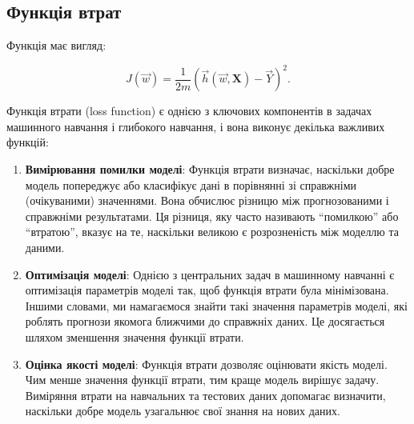\documentclass[]{article}
\begin{document}
\subsection{Функція
	втрат}\label{ux444ux443ux43dux43aux446ux456ux44f-ux432ux442ux440ux430ux442}

Функція має вигляд:

\[ J(\vec{w}) = \frac1{2m} \left( \vec{h}(\vec{w}, \mathbf{X}) - \vec{Y} \right)^2. \]

Функція втрати (loss function) є однією з ключових компонентів в задачах
машинного навчання і глибокого навчання, і вона виконує декілька
важливих функцій:

\begin{enumerate}
	\def\labelenumi{\arabic{enumi}.}
	\item
	      \textbf{Вимірювання помилки моделі}: Функція втрати визначає,
	      наскільки добре модель попереджує або класифікує дані в порівнянні зі
	      справжніми (очікуваними) значеннями. Вона обчислює різницю між
	      прогнозованими і справжніми результатами. Ця різниця, яку часто
	      називають ``помилкою'' або ``втратою'', вказує на те, наскільки
	      великою є розрозненість між моделлю та даними.
	\item
	      \textbf{Оптимізація моделі}: Однією з центральних задач в машинному
	      навчанні є оптимізація параметрів моделі так, щоб функція втрати була
	      мінімізована. Іншими словами, ми намагаємося знайти такі значення
	      параметрів моделі, які роблять прогнози якомога ближчими до справжніх
	      даних. Це досягається шляхом зменшення значення функції втрати.
	\item
	      \textbf{Оцінка якості моделі}: Функція втрати дозволяє оцінювати
	      якість моделі. Чим менше значення функції втрати, тим краще модель
	      вирішує задачу. Виміряння втрати на навчальних та тестових даних
	      допомагає визначити, наскільки добре модель узагальнює свої знання на
	      нових даних.
\end{enumerate}
\end{document}
